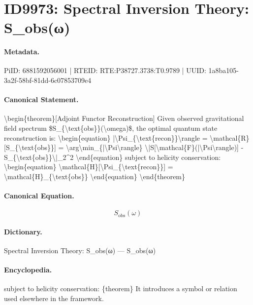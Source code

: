 \section*{ID9973: Spectral Inversion Theory: S\_obs(ω)}
\paragraph{Metadata.}
PiID: 6881592056001 | RTEID: RTE:P38727.3738:T0.9789 | UUID: 1a8ba105-3a2f-58bf-81dd-6c07853709e4

\paragraph{Canonical Statement.}
\textbackslash{}begin\{theorem\}[Adjoint Functor Reconstruction] Given observed gravitational field spectrum \$S\_\{\textbackslash{}text\{obs\}\}(\textbackslash{}omega)\$, the optimal quantum state reconstruction is: \textbackslash{}begin\{equation\} |\textbackslash{}Psi\_\{\textbackslash{}text\{recon\}\}\textbackslash{}rangle = \textbackslash{}mathcal\{R\}[S\_\{\textbackslash{}text\{obs\}\}] = \textbackslash{}arg\textbackslash{}min\_\{|\textbackslash{}Psi\textbackslash{}rangle\} \textbackslash{}|S[\textbackslash{}mathcal\{F\}(|\textbackslash{}Psi\textbackslash{}rangle)] - S\_\{\textbackslash{}text\{obs\}\}\textbackslash{}|\_2\textasciicircum{}2 \textbackslash{}end\{equation\} subject to helicity conservation: \textbackslash{}begin\{equation\} \textbackslash{}mathcal\{H\}[\textbackslash{}Psi\_\{\textbackslash{}text\{recon\}\}] = \textbackslash{}mathcal\{H\}\_\{\textbackslash{}text\{obs\}\} \textbackslash{}end\{equation\} \textbackslash{}end\{theorem\}

\paragraph{Canonical Equation.}
\[
S_{\text{obs}}(\omega)
\]

\paragraph{Dictionary.}
Spectral Inversion Theory: S\_obs(ω) — S\_obs(ω)

\paragraph{Encyclopedia.}
subject to helicity conservation: \{theorem\} It introduces a symbol or relation used elsewhere in the framework.
